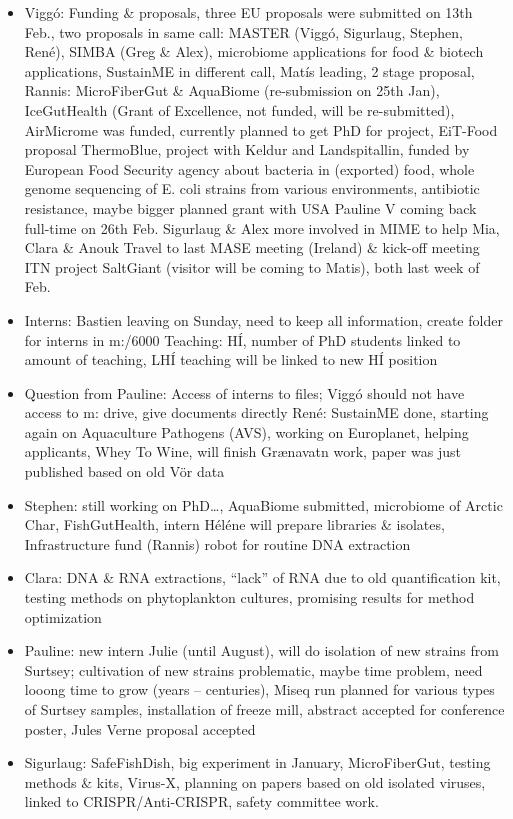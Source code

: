 \begin{itemize}
\item Viggó: Funding \& proposals, three EU proposals were submitted on 13th Feb., two proposals in same call: MASTER (Viggó, Sigurlaug, Stephen, René), SIMBA (Greg \& Alex), microbiome applications for food \& biotech applications, SustainME in different call, Matís leading, 2 stage proposal, Rannis: MicroFiberGut \& AquaBiome (re-submission on 25th Jan), IceGutHealth (Grant of Excellence, not funded, will be re-submitted), AirMicrome was funded, currently planned to get PhD for project, EiT-Food proposal ThermoBlue, project with Keldur and Landspitallin, funded by European Food Security agency about bacteria in (exported) food, whole genome sequencing of E. coli strains from various environments, antibiotic resistance, maybe bigger planned grant with USA
Pauline V coming back full-time on 26th Feb.
Sigurlaug \& Alex more involved in MIME to help Mia, Clara \& Anouk
Travel to last MASE meeting (Ireland) \& kick-off meeting ITN project SaltGiant (visitor will be coming to Matis), both last week of Feb.
\item Interns: Bastien leaving on Sunday, need to keep all information, create folder for interns in m:/6000
Teaching: HÍ, number of PhD students linked to amount of teaching, LHÍ teaching will be linked to new HÍ position
\item Question from Pauline: Access of interns to files; Viggó should not have access to m: drive, give documents directly
René: SustainME done, starting again on Aquaculture Pathogens (AVS), working on Europlanet, helping applicants, Whey To Wine, will finish Grænavatn work, paper was just published based on old Vör data
\item Stephen: still working on PhD…, AquaBiome submitted, microbiome of Arctic Char, FishGutHealth, intern Héléne will prepare libraries \& isolates, Infrastructure fund (Rannis) robot for routine DNA extraction
\item Clara: DNA \& RNA extractions, “lack” of RNA due to old quantification kit, testing methods on phytoplankton cultures, promising results for method optimization
\item Pauline: new intern Julie (until August), will do isolation of new strains from Surtsey; cultivation of new strains problematic, maybe time problem, need looong time to grow (years – centuries), Miseq run planned for various types of Surtsey samples, installation of freeze mill, abstract accepted for conference poster, Jules Verne proposal accepted
\item Sigurlaug: SafeFishDish, big experiment in January, MicroFiberGut, testing methods \& kits, Virus-X, planning on papers based on old isolated viruses, linked to CRISPR/Anti-CRISPR, safety committee work.
\end{itemize}



